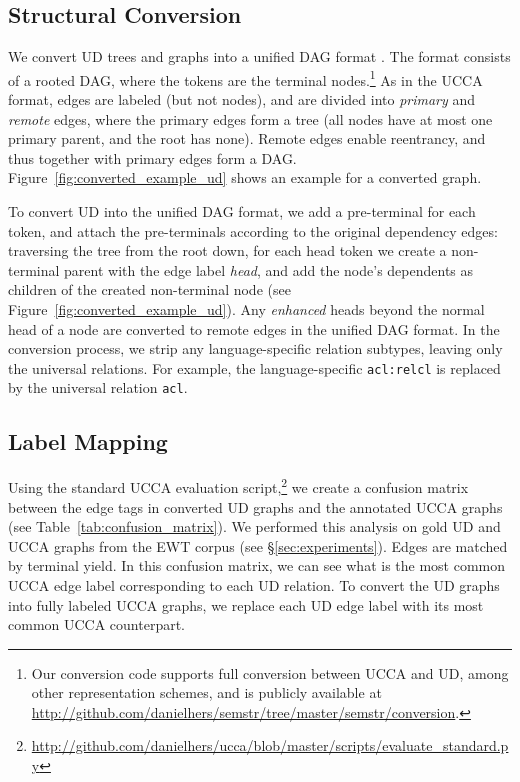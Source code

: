 \documentclass[11pt,a4paper]{article}
\begin{document}
\subsection{Structural Conversion}\label{sec:structural}

We convert UD trees and graphs into a unified DAG format \cite{hershcovich2018multitask,hershcovich2018universal}.
The format consists of a rooted DAG, where the tokens are the terminal
nodes.\footnote{Our conversion code supports full conversion between UCCA and UD,
among other representation schemes,
and is publicly available at \url{http://github.com/danielhers/semstr/tree/master/semstr/conversion}.}
As in the UCCA format, edges are labeled (but not nodes),
and are divided into \textit{primary} and \textit{remote} edges,
where the primary edges form a tree (all nodes have at most one primary parent,
and the root has none).
Remote edges enable reentrancy, and thus together with primary edges
form a DAG.
Figure~\ref{fig:converted_example_ud} shows an example for a converted graph.

To convert UD into the unified DAG format,
we add a pre-terminal for each token,
and attach the pre-terminals according to the original dependency edges:
traversing the tree from the root down, for each head token we create a non-terminal
parent with the edge label {\it head},
and add the node's dependents as children of the created non-terminal node
(see Figure~\ref{fig:converted_example_ud}).
Any \textit{enhanced}
heads beyond the normal head of a node are converted to remote edges in the unified DAG format.
In the conversion process, we strip any language-specific relation subtypes,
leaving only the universal relations.
For example, the language-specific \verb|acl:relcl| is replaced by the universal relation \verb|acl|.



\subsection{Label Mapping}\label{sec:mapping}

Using the standard UCCA evaluation
script,\footnote{\url{http://github.com/danielhers/ucca/blob/master/scripts/evaluate_standard.py}}
we create a confusion matrix between the edge tags in converted UD graphs
and the annotated UCCA graphs (see Table~\ref{tab:confusion_matrix}).
We performed this analysis on gold UD and UCCA graphs from the EWT corpus (see \S\ref{sec:experiments}).
Edges are matched by terminal yield.
In this confusion matrix, we can see what is the most common UCCA edge label corresponding
to each UD relation.
To convert the UD graphs into fully labeled UCCA graphs,
we replace each UD edge label with its most common UCCA counterpart.
\end{document}
